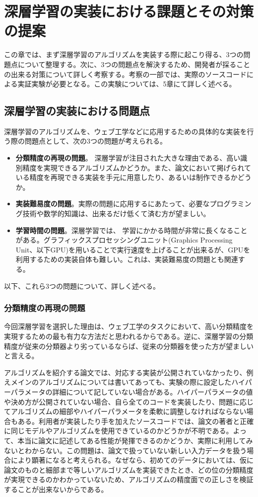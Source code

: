 \chapter{深層学習の実装における課題とその対策の提案}
この章では、まず深層学習のアルゴリズムを実装する際に起こり得る、3つの問題点について整理する。次に、3つの問題点を解決するため、開発者が採ることの出来る対策について詳しく考察する。考察の一部では、実際のソースコードによる実証実験が必要となる。この実験については、5章にて詳しく述べる。

\section{深層学習の実装における問題点}
深層学習のアルゴリズムを、ウェブ工学などに応用するための具体的な実装を行う際の問題点として、次の3つの問題が考えられる。
\begin{itemize}
\item \textbf{分類精度の再現の問題}。 深層学習が注目された大きな理由である、高い識別精度を実現できるアルゴリズムかどうか。また、論文において掲げられている精度を再現できる実装を手元に用意したり、あるいは制作できるかどうか。
\item \textbf{実装難易度の問題}。実際の問題に応用するにあたって、必要なプログラミング技術や数学的知識は、出来るだけ低くて済む方が望ましい。
\item \textbf{学習時間の問題}。深層学習では、 学習にかかる時間が非常に長くなることがある。グラフィックスプロセッシングユニット(Graphics Processing Unit、以下GPU)を用いることで実行速度を上げることが出来るが、GPUを利用するための実装自体も難しい。これは、実装難易度の問題とも関連する。
\end{itemize}
以下、これら3つの問題について、詳しく述べる。

\subsection{分類精度の再現の問題}
今回深層学習を選択した理由は、ウェブ工学のタスクにおいて、高い分類精度を実現するための最も有力な方法だと思われるからである。逆に、深層学習の分類精度が従来の分類器より劣っているならば、従来の分類器を使った方が望ましいと言える。\par
アルゴリズムを紹介する論文では、対応する実装が公開されていなかったり、例えメインのアルゴリズムについては書いてあっても、実験の際に設定したハイパーパラメータの詳細について記していない場合がある。ハイパーパラメータの値や決め方が公開されていない場合、自ら全てのコードを実装したり、問題に応じてアルゴリズムの細部やハイパーパラメータを柔軟に調整しなければならない場合もある。利用者が実装したり手を加えたソースコードでは、論文の著者と正確に同じモデルやアルゴリズムを使用できているのかどうかが不明である。よって、本当に論文に記述してある性能が発揮できるのかどうか、実際に利用してみないとわからない。この問題は、論文で扱っていない新しい入力データを扱う場合により顕著になると考えられる。なぜなら、初めてのデータにおいては、仮に論文のものと細部まで等しいアルゴリズムを実装できたとき、どの位の分類精度が実現できるのかわかっていないため、アルゴリズムの精度面での正しさを検証することが出来ないからである。\par

